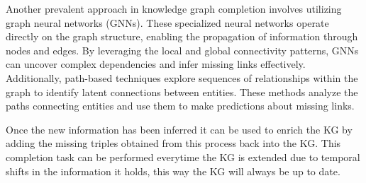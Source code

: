 Another prevalent approach in knowledge graph completion involves utilizing graph neural networks (GNNs). These specialized neural networks operate directly on the graph structure, enabling the propagation of information through nodes and edges. By leveraging the local and global connectivity patterns, GNNs can uncover complex dependencies and infer missing links effectively. Additionally, path-based techniques explore sequences of relationships within the graph to identify latent connections between entities. These methods analyze the paths connecting entities and use them to make predictions about missing links.

Once the new information has been inferred it can be used to enrich the KG by adding the missing triples obtained from this process back into the KG. This completion task can be performed everytime the KG is extended due to temporal shifts in the information it holds, this way the KG will always be up to date.




